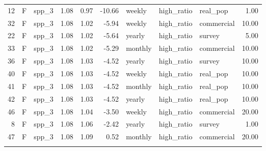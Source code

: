 \begin{longtable}{rllrrrlllr}
   12 & F & spp\_3 & 1.08 & 0.97 & -10.66 & weekly & high\_ratio & real\_pop & 1.00 \\ 
   32 & F & spp\_3 & 1.08 & 1.02 & -5.94 & weekly & high\_ratio & commercial & 10.00 \\ 
   22 & F & spp\_3 & 1.08 & 1.02 & -5.64 & yearly & high\_ratio & survey & 5.00 \\ 
   33 & F & spp\_3 & 1.08 & 1.02 & -5.29 & monthly & high\_ratio & commercial & 10.00 \\ 
   36 & F & spp\_3 & 1.08 & 1.03 & -4.52 & yearly & high\_ratio & survey & 10.00 \\ 
   40 & F & spp\_3 & 1.08 & 1.03 & -4.52 & weekly & high\_ratio & real\_pop & 10.00 \\ 
   41 & F & spp\_3 & 1.08 & 1.03 & -4.52 & monthly & high\_ratio & real\_pop & 10.00 \\ 
   42 & F & spp\_3 & 1.08 & 1.03 & -4.52 & yearly & high\_ratio & real\_pop & 10.00 \\ 
   46 & F & spp\_3 & 1.08 & 1.04 & -3.50 & weekly & high\_ratio & commercial & 20.00 \\ 
    8 & F & spp\_3 & 1.08 & 1.06 & -2.42 & yearly & high\_ratio & survey & 1.00 \\ 
   47 & F & spp\_3 & 1.08 & 1.09 & 0.52 & monthly & high\_ratio & commercial & 20.00 \\ 
   \hline
\hline
\label{tab:7}
\end{longtable}
